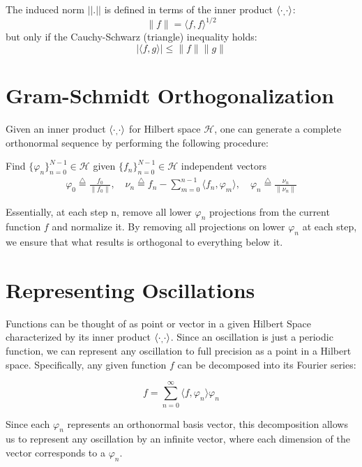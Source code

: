 The induced norm $||.||$ is defined in terms of the inner product $\langle\cdot _, \cdot\rangle$:
\begin{equation}
  \|f\| = \langle f, f \rangle^{1/2} 
\end{equation}
but only if the Cauchy-Schwarz (triangle) inequality holds:
\begin{equation}
|\langle f, g \rangle| \leq \|f\|\|g\| 
\end{equation}

\section{Gram-Schmidt Orthogonalization}
Given an inner product $\langle\cdot _, \cdot\rangle$ for Hilbert space $\mathcal{H}$, one can generate a complete orthonormal sequence by performing the following procedure:

Find $\{ \varphi_n \}_{n=0}^{N-1} \in \mathcal{H}$ given $\{ f_n \}_{n=0}^{N-1} \in \mathcal{H}$ independent vectors
\begin{equation}
\begin{gathered}
  \varphi_0 \overset{\bigtriangleup}{=} \frac{f_0}{\| f_0 \|} , \quad
  \nu_n \overset{\bigtriangleup}{=} f_n - \sum_{m=0}^{n-1} \langle f_n , \varphi_m \rangle , \quad
  \varphi_n \overset{\bigtriangleup}{=} \frac{\nu_n}{\| \nu_n \|}
\end{gathered}
\end{equation}

Essentially, at each step n, remove all lower $\varphi_n$ projections from the current function $f$ and normalize it.  By removing all projections on lower $\varphi_n$ at each step, we ensure that what results is orthogonal to everything below it. 

\section{Representing Oscillations}

Functions can be thought of as point or vector in a given Hilbert Space characterized by its inner product $\langle\cdot _, \cdot\rangle$. Since an oscillation is just a periodic function, we can represent any oscillation to full precision as a point in a Hilbert space.  Specifically, any given function $f$ can be decomposed into its Fourier series:

\begin{equation}
  f = \sum_{n=0}^\infty \langle f, \varphi_n \rangle \varphi_n
\end{equation}

Since each $\varphi_n$ represents an orthonormal basis vector, this decomposition allows us to represent any oscillation by an infinite vector, where each dimension of the vector corresponds to a $\varphi_n$.


